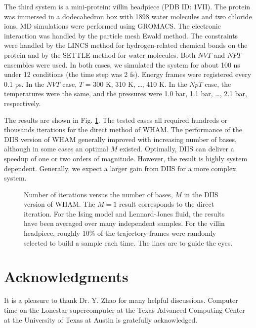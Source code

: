\documentclass[reprint,superscriptaddress]{revtex4-1}
\begin{document}
The third system is a mini-protein:
villin headpiece\cite{duan1998}
(PDB ID: 1VII).
%
The protein was immersed in
a dodecahedron box with 1898 water molecules and two chloride ions.
%
MD simulations were performed
using GROMACS\cite{
  berendsen1995, *lindahl2001, *vanderspoel2005, *hess2008}.
%
The electronic interaction was
handled by the particle mesh Ewald method\cite{
  essmann1995}.
%
The constraints were handled by the LINCS method\cite{
  hess1997}
for hydrogen-related chemical bonds on the protein
and by the SETTLE method\cite{
  miyamoto1992}
for water molecules.
%
Both $NVT$ and $NPT$ ensembles were used.
%
In both cases, we simulated the system
for about {\color{red} 100} ns
under 12 conditions
(the time step was 2 fs).
%
Energy frames were registered every 0.1 ps.
%
In the $NVT$ case,
$T$ = 300 K, 310 K, \dots, 410 K.
%
In the $NpT$ case,
the temperatures were the same,
and the pressures were
1.0 bar, 1.1 bar, \dots, 2.1 bar,
respectively.



The results are shown in Fig. \ref{fig:niter}.
%
The tested cases
all required hundreds or thousands iterations
for the direct method of WHAM.
%
The performance of the DIIS version of WHAM
generally improved with increasing number of bases,
although in some cases an optimal $M$ existed.
%
Optimally, DIIS can deliver a speedup of one or two orders of magnitude.
%
However, the result is highly system dependent.
%
Generally, we expect a larger gain from DIIS
for a more complex system.




\begin{figure}[h]
  \caption{
    \label{fig:niter}
    Number of iterations versus the number of bases, $M$
    in the DIIS version of WHAM.
    The $M = 1$ result corresponds to the direct iteration.
    For the Ising model and Lennard-Jones fluid,
    the results have been averaged over many independent samples.
    For the villin headpiece,
    roughly 10\% of the trajectory frames
    were randomly selected to build a sample each time.
    The lines are to guide the eyes.
  }
\end{figure}





\section{Acknowledgments}



It is a pleasure to thank Dr. Y. Zhao
for many helpful discussions.
%
Computer time on the Lonestar supercomputer
at the Texas Advanced Computing Center
at the University of Texas at Austin
is gratefully acknowledged.




\end{document}
